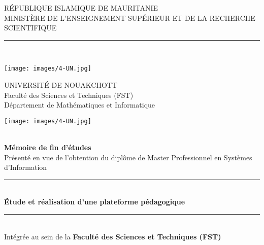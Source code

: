 
\begin{titlepage}
    \centering
    {\small RÉPUBLIQUE ISLAMIQUE DE MAURITANIE}\\
    
    {\small MINISTÈRE DE L’ENSEIGNEMENT SUPÉRIEUR ET DE LA RECHERCHE SCIENTIFIQUE}\\
       
\rule{\linewidth}{0.3mm} \\[0.4cm]

\begin{minipage}{3cm}
	\begin{center}
		\texttt{[image: images/4-UN.jpg]}
	\end{center}
\end{minipage}\hfill
\begin{minipage}{10cm}
	\begin{center}
	\centering
	
	{\small UNIVERSITÉ DE NOUAKCHOTT }\\[0.1cm]
    {\small Faculté des Sciences et Techniques (FST)}\\[0.2cm]
    {\small Département de Mathématiques et Informatique}\\[0.1cm]
	\end{center}
\end{minipage}
\begin{minipage}{3.5cm}
	\begin{center}
		\texttt{[image: images/4-UN.jpg]}
	\end{center}
\end{minipage}\hfill\\
\vspace{20mm}
{\large \bfseries Mémoire de fin d’études}\\[0.3cm]
{\large Présenté en vue de l’obtention du diplôme de Master Professionnel en Systèmes d’Information
}\\[0.1cm]
\vspace{0.1mm}
\rule{\linewidth}{0.3mm} \\[0.3cm]
{ \huge \bfseries \textbf{\textcolor{myRed}{Étude et réalisation d’une plateforme pédagogique}} \\[0.3cm] }
\rule{\linewidth}{0.3mm} \\[1cm]
{\large Intégrée au sein de la }
{\large \bfseries Faculté des Sciences et Techniques (FST) }\\\vspace{2mm}


\end{titlepage}
